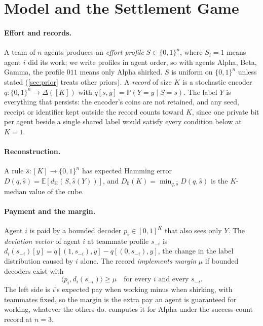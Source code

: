 \documentclass[sigconf,anonymous,acmthm=false]{acmart}
\theoremstyle{acmplain}
\theoremstyle{acmdefinition}
\newcommand{\E}{\mathbb{E}}
\newcommand{\Pb}{\mathbb{P}}
\newcommand{\dH}{d_{\mathrm{H}}}
\newcommand{\shat}{\hat{s}}
\newcommand{\cube}{\{0,1\}}
\newcommand{\A}{\textsf{Alpha}}
\newcommand{\B}{\textsf{Beta}}
\newcommand{\G}{\textsf{Gamma}}
\begin{document}
\section{Model and the Settlement Game}\label{sec:model}

\paragraph{Effort and records.} A team of $n$ agents produces an \emph{effort profile}
$S\in\cube^n$, where $S_i=1$ means agent $i$ did its work; we write profiles in agent order,
so with agents \A, \B, \G, the profile $011$ means only \A{} shirked. $S$ is uniform on
$\cube^n$ unless stated (\cref{sec:prior} treats other priors). A \emph{record} of size $K$
is a stochastic encoder $q:\cube^n\to\Delta([K])$ with $q[s,y]=\Pb(Y=y\mid S=s)$. The label
$Y$ is everything that persists: the encoder's coins are not retained, and any seed, receipt
or identifier kept outside the record counts toward $K$, since one private bit per agent
beside a single shared label would satisfy every condition below at $K=1$.

\paragraph{Reconstruction.} A rule $\shat:[K]\to\cube^n$ has expected Hamming error
$D(q,\shat)=\E[\dH(S,\shat(Y))]$, and $D_0(K)=\min_{q,\shat}D(q,\shat)$ is the $K$-median
value of the cube.

\paragraph{Payment and the margin.} Agent $i$ is paid by a bounded decoder $p_i\in[0,1]^K$
that also sees only $Y$. The \emph{deviation vector} of agent $i$ at teammate profile
$s_{-i}$ is $d_i(s_{-i})[y]=q[(1,s_{-i}),y]-q[(0,s_{-i}),y]$, the change in the label
distribution caused by $i$ alone. The record \emph{implements margin} $\mu$ if bounded
decoders exist with
\begin{equation}\label{eq:M}\tag{M}
\langle p_i,d_i(s_{-i})\rangle\ge\mu\quad\text{for every } i \text{ and every } s_{-i}.
\end{equation}
The left side is $i$'s expected pay when working minus when shirking, with teammates fixed,
so the margin is the extra pay an agent is guaranteed for working, whatever the others do.
 computes it for \A{} under the success-count record at $n=3$.
\end{document}
